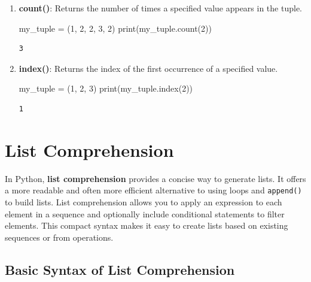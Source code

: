 \documentclass[
  letterpaper,
  DIV=11,
  numbers=noendperiod]{scrreprt}
\newenvironment{Shaded}{\begin{snugshade}}{\end{snugshade}}
\newcommand{\BuiltInTok}[1]{\textcolor[rgb]{0.00,0.23,0.31}{#1}}
\newcommand{\DecValTok}[1]{\textcolor[rgb]{0.68,0.00,0.00}{#1}}
\newcommand{\NormalTok}[1]{\textcolor[rgb]{0.00,0.23,0.31}{#1}}
\newcommand{\OperatorTok}[1]{\textcolor[rgb]{0.37,0.37,0.37}{#1}}
\begin{document}
\begin{enumerate}
\def\labelenumi{\arabic{enumi}.}
\item
  \textbf{count()}: Returns the number of times a specified value
  appears in the tuple.

\begin{Shaded}
\begin{Highlighting}[]
\NormalTok{my\_tuple }\OperatorTok{=}\NormalTok{ (}\DecValTok{1}\NormalTok{, }\DecValTok{2}\NormalTok{, }\DecValTok{2}\NormalTok{, }\DecValTok{3}\NormalTok{, }\DecValTok{2}\NormalTok{)}
\BuiltInTok{print}\NormalTok{(my\_tuple.count(}\DecValTok{2}\NormalTok{))  }
\end{Highlighting}
\end{Shaded}

\begin{verbatim}
3
\end{verbatim}
\item
  \textbf{index()}: Returns the index of the first occurrence of a
  specified value.

\begin{Shaded}
\begin{Highlighting}[]
\NormalTok{my\_tuple }\OperatorTok{=}\NormalTok{ (}\DecValTok{1}\NormalTok{, }\DecValTok{2}\NormalTok{, }\DecValTok{3}\NormalTok{)}
\BuiltInTok{print}\NormalTok{(my\_tuple.index(}\DecValTok{2}\NormalTok{)) }
\end{Highlighting}
\end{Shaded}

\begin{verbatim}
1
\end{verbatim}
\end{enumerate}

\hypertarget{list-comprehension}{%
\section{List Comprehension}\label{list-comprehension}}

In Python, \textbf{list comprehension} provides a concise way to
generate lists. It offers a more readable and often more efficient
alternative to using loops and \texttt{append()} to build lists. List
comprehension allows you to apply an expression to each element in a
sequence and optionally include conditional statements to filter
elements. This compact syntax makes it easy to create lists based on
existing sequences or from operations.

\hypertarget{basic-syntax-of-list-comprehension}{%
\subsection{Basic Syntax of List
Comprehension}\label{basic-syntax-of-list-comprehension}}
\end{document}
